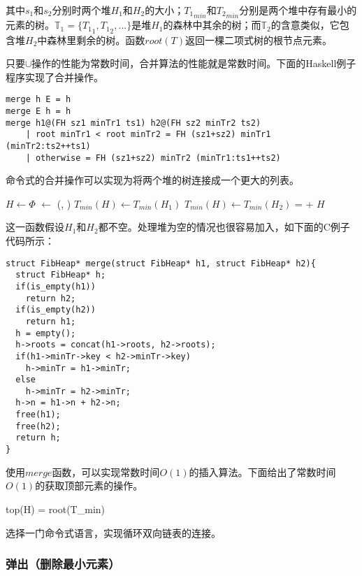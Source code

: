 \documentclass[UTF8]{article}
\begin{document}
其中$s_1$和$s_2$分别时两个堆$H_1$和$H_2$的大小；${T_1}_{min}$和${T_2}_{min}$分别是两个堆中存有最小的元素的树。$\mathbb{T}_1 = \{{T_1}_1, {T_1}_2, ...\}$是堆$H_1$的森林中其余的树；而$\mathbb{T}_2$的含意类似，它包含堆$H_2$中森林里剩余的树。函数$root(T)$返回一棵二项式树的根节点元素。

只要$\cup$操作的性能为常数时间，合并算法的性能就是常数时间。下面的Haskell例子程序实现了合并操作。

\lstset{language=Haskell}
\begin{lstlisting}
merge h E = h
merge E h = h
merge h1@(FH sz1 minTr1 ts1) h2@(FH sz2 minTr2 ts2)
    | root minTr1 < root minTr2 = FH (sz1+sz2) minTr1 (minTr2:ts2++ts1)
    | otherwise = FH (sz1+sz2) minTr2 (minTr1:ts1++ts2)
\end{lstlisting}

命令式的合并操作可以实现为将两个堆的树连接成一个更大的列表。

\begin{algorithmic}[1]
  \State $H \gets \Phi$
  \State {} $\gets$ (, )
    \State $T_{min}(H) \gets T_{min}(H_1)$
  \Else
    \State $T_{min}(H) \gets T_{min}(H_2)$
  \EndIf
   =  + 
  \State \Return $H$
\EndFunction
\end{algorithmic}

这一函数假设$H_1$和$H_2$都不空。处理堆为空的情况也很容易加入，如下面的C例子代码所示：

\lstset{language=C}
\begin{lstlisting}
struct FibHeap* merge(struct FibHeap* h1, struct FibHeap* h2){
  struct FibHeap* h;
  if(is_empty(h1))
    return h2;
  if(is_empty(h2))
    return h1;
  h = empty();
  h->roots = concat(h1->roots, h2->roots);
  if(h1->minTr->key < h2->minTr->key)
    h->minTr = h1->minTr;
  else
    h->minTr = h2->minTr;
  h->n = h1->n + h2->n;
  free(h1);
  free(h2);
  return h;
}
\end{lstlisting}

使用$merge$函数，可以实现常数时间$O(1)$的插入算法。下面给出了常数时间$O(1)$的获取顶部元素的操作。

\be
top(H) = root(T_{min})
\ee

\begin{Exercise}
选择一门命令式语言，实现循环双向链表的连接。
\end{Exercise}

\subsubsection{弹出（删除最小元素）}
 
\end{document}
